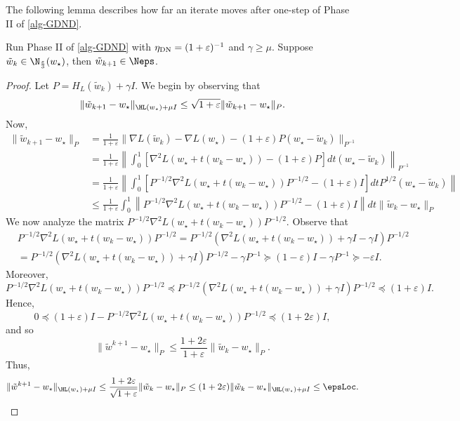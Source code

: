 The following lemma describes how far an iterate moves after one-step of Phase II of \cref{alg-GDND}.
\begin{lemma}
\label{lemma:one_step_evol}
    Run Phase II of \cref{alg-GDND} with $\eta_{\textup{DN}} = (1+\varepsilon)^{-1}$ and $\gamma \geq \mu$.
    Suppose $\tilde w_k \in \N_{\frac{\varepsilon}{3}}(w_\star)$, then $\tilde w_{k+1}\in \Neps$.
\end{lemma}

\begin{proof}
    Let $P = H_L(\tilde w_k)+\gamma I$.
    We begin by observing that 
    \begin{align*}
        \|\tilde w_{k+1}-w_\star\|_{\HL(w_\star)+\mu I}\leq \sqrt{1+\varepsilon}\|\tilde w_{k+1}-w_\star\|_{P}.
    \end{align*}
    Now,
    \begin{align*}
        \|\tilde w_{k+1}-w_\star\|_P & = \frac{1}{1+\varepsilon}\|\nabla L(\tilde w_{k})-\nabla L(w_\star)-(1+\varepsilon)P(w_\star-\tilde w_k)\|_{P^{-1}} \\ &=
        \frac{1}{1+\varepsilon}\left\|\int_{0}^{1}\left[\nabla^2 L(w_\star+t(w_k-w_\star))-(1+\varepsilon)P\right]dt(w_\star-\tilde w_k)\right\|_{P^{-1}} \\
        & =   \frac{1}{1+\varepsilon}\left\|\int_{0}^{1}\left[P^{-1/2}\nabla^2 L(w_\star+t(w_k-w_\star))P^{-1/2}-(1+\varepsilon)I\right]dtP^{1/2}(w_\star-\tilde w_k)\right\|\\
        &\leq \frac{1}{1+\varepsilon}\int_{0}^{1}\left\|P^{-1/2}\nabla^2 L(w_\star+t(w_k-w_\star))P^{-1/2}-(1+\varepsilon)I\right\|dt\|\tilde w_k-w_\star\|_{P}
    \end{align*}
    We now analyze the matrix $P^{-1/2}\nabla^2 L(w_\star+t(w_k-w_\star))P^{-1/2}$. 
    Observe that
    \begin{align*}
        & P^{-1/2}\nabla^2 L(w_\star+t(w_k-w_\star))P^{-1/2} = P^{-1/2}(\nabla^2 L(w_\star+t(w_k-w_\star))+\gamma I-\gamma I)P^{-1/2} \\
        & = P^{-1/2}(\nabla^2 L(w_\star+t(w_k-w_\star))+\gamma I)P^{-1/2}-\gamma P^{-1} \succeq (1-\varepsilon)I-\gamma P^{-1} \succeq -\varepsilon I.
    \end{align*}
    Moreover,
    \[
    P^{-1/2}\nabla^2 L(w_\star+t(w_k-w_\star))P^{-1/2}\preceq P^{-1/2}(\nabla^2 L(w_\star+t(w_k-w_\star))+\gamma I)P^{-1/2}\preceq (1+\varepsilon)I.
    \]
    Hence, 
    \[0 \preceq (1+\varepsilon)I-P^{-1/2}\nabla^2 L(w_\star+t(w_k-w_\star))P^{-1/2}\preceq (1+2\varepsilon)I,\] 
    and so
    \[
    \|\tilde w^{k+1}-w_\star\|_P\leq \frac{1+2\varepsilon}{1+\varepsilon}\|\tilde w_k-w_\star\|_{P}.
    \]
    Thus,
    \[
    \|\tilde w^{k+1}-w_\star\|_{\HL(w_\star)+\mu I}\leq \frac{1+2\varepsilon}{\sqrt{1+\varepsilon}}\|\tilde w_k-w_\star\|_P \leq(1+2\varepsilon)\|\tilde w_k-w_\star\|_{\HL(w_\star)+\mu I}\leq \epsLoc.
    \]
\end{proof}

